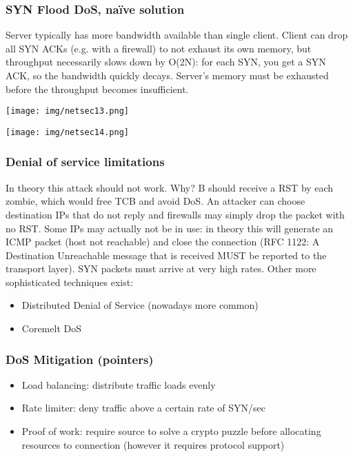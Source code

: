 \documentclass[a4paper, 10pt, titlepage]{article}
\begin{document}
\subsubsection*{SYN Flood DoS, naïve solution}
Server typically has more bandwidth available than single client. Client can drop all SYN ACKs (e.g. with a firewall) to not exhaust its own memory, but throughput necessarily slows down by O(2N): for each SYN, you get a SYN ACK, so the bandwidth quickly decays. Server’s memory must be exhausted before the throughput becomes insufficient.
\begin{center}
	\texttt{[image: img/netsec13.png]}
\end{center}
\begin{center}
	\texttt{[image: img/netsec14.png]}
\end{center}

\subsubsection*{Denial of service limitations}
In theory this attack should not work. Why? B should receive a RST by each zombie, which would free TCB and avoid DoS. An attacker can choose destination IPs that do not reply and firewalls may simply drop the packet with no RST. Some IPs may actually not be in use: in theory this will generate an ICMP packet (host not reachable) and close the connection (RFC 1122: A Destination Unreachable message that is received MUST be reported to the transport layer).
SYN packets must arrive at very high rates. Other more sophisticated techniques exist:
\begin{itemize}
\item Distributed Denial of Service (nowadays more common)
\item Coremelt DoS
\end{itemize}

\subsubsection*{DoS Mitigation (pointers)}
\begin{itemize}
\item Load balancing: distribute traffic loads evenly
\item Rate limiter: deny traffic above a certain rate of SYN/sec
\item Proof of work: require source to solve a crypto puzzle before allocating resources to connection (however it requires protocol support)
\end{itemize}
\end{document}
